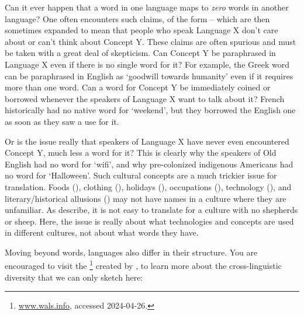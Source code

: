 Can it ever happen that a word in one language maps to \textit{zero} words in another language?  One often encounters such claims, of the form  -- which are then sometimes expanded to mean that people who speak Language X don't care about or can't think about Concept Y.   These claims are often spurious and must be taken with a great deal of skepticism. 
Can Concept Y be paraphrased in Language X even if there is no single word for it? For example, the Greek word  can be paraphrased in English as `goodwill towards humanity' even if it requires more than one word.   Can a word for Concept Y be immediately coined or borrowed whenever the speakers of Language X want to talk about it? French historically had no native word for `weekend', but they borrowed the English one as soon as they saw a use for it. 

Or is the issue really that speakers of Language X have never even encountered Concept Y, much less a word for it?  This is clearly why the speakers of Old English had no word for `wifi', and why pre-colonized indigenous Americans had no word for `Halloween'.  Such cultural concepts are a much trickier issue for translation.  Foods (), clothing (), holidays (), occupations (), technology (), and literary/historical allusions () may not have names in a culture where they are unfamiliar.  As \citet{Jurafsky.Martin-09} describe, it is not easy to translate  for a culture with no shepherds or sheep.  Here, the issue is really about what technologies and concepts are used in different cultures, not about what words they have. %

Moving beyond words, languages also differ in their structure.  You are encouraged to visit the \footnote{\url{www.wals.info}, accessed 2024-04-26.} created by \citet{wals}, to learn more about the cross-linguistic diversity that we can only sketch here:



